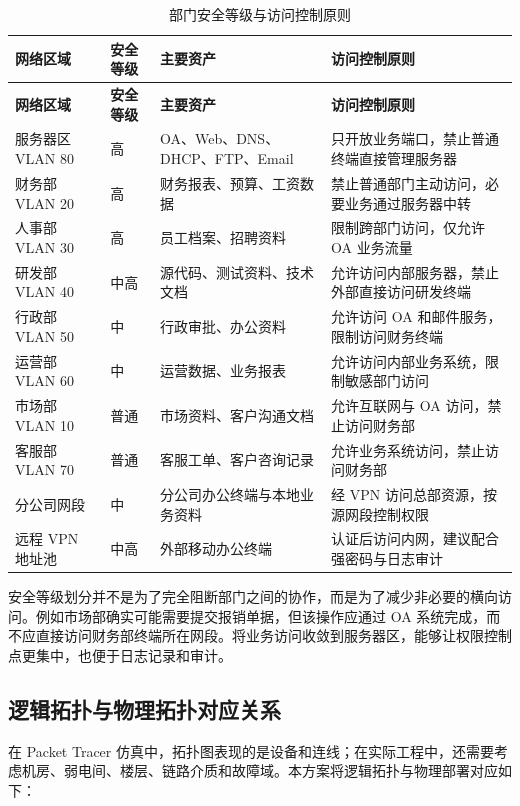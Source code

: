 \documentclass[12pt,a4paper]{ctexart}
\begin{document}
\begin{longtable}{|p{2.8cm}|p{2.2cm}|p{4cm}|p{5cm}|}
\caption{部门安全等级与访问控制原则}
\label{tab:security-level}\\
\hline
\textbf{网络区域} & \textbf{安全等级} & \textbf{主要资产} & \textbf{访问控制原则} \\ \hline
\endfirsthead
\hline
\textbf{网络区域} & \textbf{安全等级} & \textbf{主要资产} & \textbf{访问控制原则} \\ \hline
\endhead
服务器区 VLAN 80 & 高 & OA、Web、DNS、DHCP、FTP、Email & 只开放业务端口，禁止普通终端直接管理服务器 \\ \hline
财务部 VLAN 20 & 高 & 财务报表、预算、工资数据 & 禁止普通部门主动访问，必要业务通过服务器中转 \\ \hline
人事部 VLAN 30 & 高 & 员工档案、招聘资料 & 限制跨部门访问，仅允许 OA 业务流量 \\ \hline
研发部 VLAN 40 & 中高 & 源代码、测试资料、技术文档 & 允许访问内部服务器，禁止外部直接访问研发终端 \\ \hline
行政部 VLAN 50 & 中 & 行政审批、办公资料 & 允许访问 OA 和邮件服务，限制访问财务终端 \\ \hline
运营部 VLAN 60 & 中 & 运营数据、业务报表 & 允许访问内部业务系统，限制敏感部门访问 \\ \hline
市场部 VLAN 10 & 普通 & 市场资料、客户沟通文档 & 允许互联网与 OA 访问，禁止访问财务部 \\ \hline
客服部 VLAN 70 & 普通 & 客服工单、客户咨询记录 & 允许业务系统访问，禁止访问财务部 \\ \hline
分公司网段 & 中 & 分公司办公终端与本地业务资料 & 经 VPN 访问总部资源，按源网段控制权限 \\ \hline
远程 VPN 地址池 & 中高 & 外部移动办公终端 & 认证后访问内网，建议配合强密码与日志审计 \\ \hline
\end{longtable}

安全等级划分并不是为了完全阻断部门之间的协作，而是为了减少非必要的横向访问。例如市场部确实可能需要提交报销单据，但该操作应通过 OA 系统完成，而不应直接访问财务部终端所在网段。将业务访问收敛到服务器区，能够让权限控制点更集中，也便于日志记录和审计。

\subsection{逻辑拓扑与物理拓扑对应关系}

在 Packet Tracer 仿真中，拓扑图表现的是设备和连线；在实际工程中，还需要考虑机房、弱电间、楼层、链路介质和故障域。本方案将逻辑拓扑与物理部署对应如下：
\end{document}
